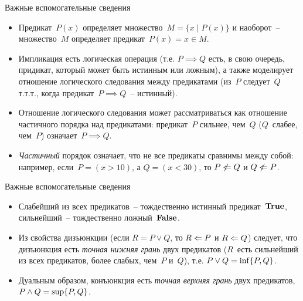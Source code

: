 \documentclass[landscape]{slides}
\begin{document}
\begin{slide}
    Важные вспомогательные сведения
    \begin{itemize}
        \item Предикат~$P(x)$ определяет множество~$M=\{x\mid P(x)\}$ и наоборот~-- множество~$M$ определяет предикат~$P(x) = x\in M$.
        \item Импликация есть логическая операция (т.е. $P\implies Q$ есть, в свою очередь, придикат, который может быть истинным или ложным), а также моделирует отношение логического следования между предикатами (из~$P$ следует~$Q$ т.т.т., когда предикат~$P\implies Q$~-- истинный).
        \item Отношение логического следования может рассматриваться как отношение частичного порядка над предикатами: предикат~$P$ сильнее, чем~$Q$ ($Q$~слабее, чем~$P$) означает~$P\implies Q$.
        \item \emph{Частичный} порядок означает, что не все предикаты сравнимы между собой: например, если~$P=(x>10)$, а $Q=(x<30)$, то $P\not\Leftarrow Q$ и $Q\not\Leftarrow P$.
    \end{itemize}
\end{slide}

\begin{slide}
    Важные вспомогательные сведения
    \begin{itemize}
            \item Слабейший из всех предикатов~-- тождественно истинный предикат~$\mathbf{True}$, сильнейший~-- тождественно ложный~$\mathbf{False}$.
            \item Из свойства дизъюнкции (если $R=P\lor Q$, то $R\Leftarrow P$ и $R\Leftarrow Q$) следует, что дизъюнкция есть \emph{точная нижняя грань} двух предикатов ($R$~есть сильнейший из всех предикатов, более слабых, чем~$P$ и~$Q$), т.е. $P\lor Q = \mathrm{inf}\{P, Q\}$.
            \item Дуальным образом, конъюнкция есть \emph{точная верхняя грань} двух предикатов, $P\land Q = \mathrm{sup}\{P, Q\}$.
    \end{itemize}
\end{slide}
\end{document}
